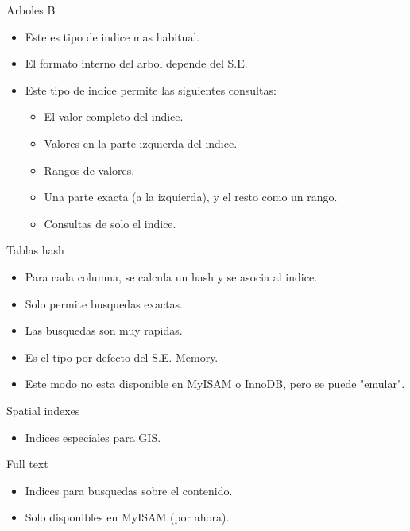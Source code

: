 \begin{frame}{Arboles B}
  \begin{itemize}
    \item Este es tipo de indice mas habitual.
    \item El formato interno del arbol depende del S.E.
    \item Este tipo de indice permite las siguientes consultas:
    \begin{itemize}
      \item El valor completo del indice.
      \item Valores en la parte izquierda del indice.
      \item Rangos de valores.
      \item Una parte exacta (a la izquierda), y el resto como un rango.
      \item Consultas de solo el indice.
    \end{itemize}
  \end{itemize}
\end{frame}

\begin{frame}{Tablas hash}
  \begin{itemize}
    \item Para cada columna, se calcula un hash y se asocia al indice.
    \item Solo permite busquedas exactas.
    \item Las busquedas son muy rapidas.
    \item Es el tipo por defecto del S.E. Memory.
    \item Este modo no esta disponible en MyISAM o InnoDB, pero se puede "emular".
  \end{itemize}
\end{frame}

\begin{frame}{Spatial indexes}
  \begin{itemize}
    \item Indices especiales para GIS.
  \end{itemize}
\end{frame}

\begin{frame}{Full text}
  \begin{itemize}
    \item Indices para busquedas sobre el contenido.
    \item Solo disponibles en MyISAM (por ahora).
  \end{itemize}
\end{frame}

